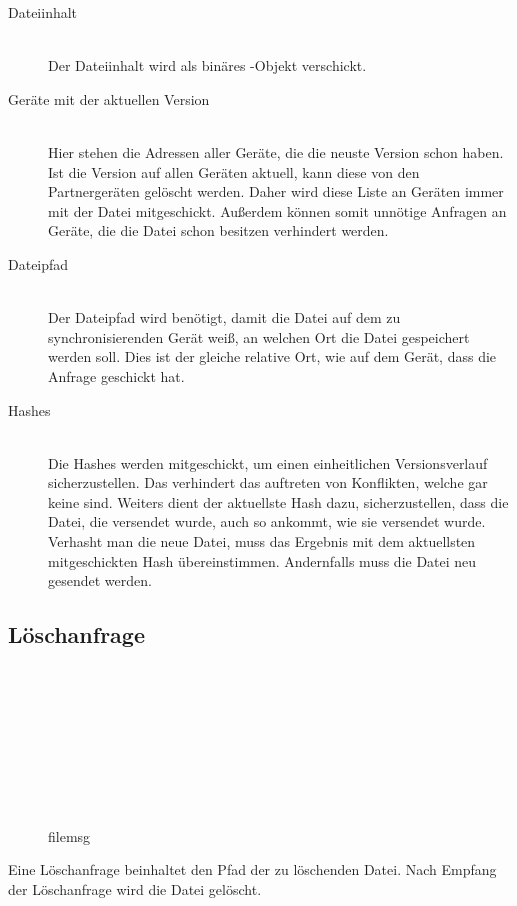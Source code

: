 \begin{description}
	\item[{Dateiinhalt}] \hfill \\
		Der Dateiinhalt wird als binäres -Objekt verschickt.
	\item[{Geräte mit der aktuellen Version}] \hfill \\
		Hier stehen die Adressen aller Geräte, die die neuste Version schon haben. Ist die Version auf allen Geräten aktuell, kann diese von den Partnergeräten gelöscht werden. Daher wird diese Liste an Geräten immer mit der Datei mitgeschickt. Außerdem können somit unnötige Anfragen an Geräte, die die Datei schon besitzen verhindert werden.
	\item[{Dateipfad}] \hfill \\
		Der Dateipfad wird benötigt, damit die Datei auf dem zu synchronisierenden Gerät weiß, an welchen Ort die Datei gespeichert werden soll. Dies ist der gleiche relative Ort, wie auf dem Gerät, dass die Anfrage geschickt hat.
	\item[{Hashes}] \hfill \\
		Die Hashes werden mitgeschickt, um einen einheitlichen Versionsverlauf sicherzustellen. Das verhindert das auftreten von Konflikten, welche gar keine sind. Weiters dient der aktuellste Hash dazu,  sicherzustellen, dass die Datei, die versendet wurde, auch so ankommt, wie sie versendet wurde. Verhasht man die neue Datei, muss das Ergebnis mit dem aktuellsten mitgeschickten Hash übereinstimmen. Andernfalls muss die Datei neu gesendet werden.
\end{description}
		
\subsection{Löschanfrage}
\begin{figure}[H]
\begin{centering}

\begin{bytefield}[bitwidth=3em]{8}
	\\
	 \\
	
	\begin{rightwordgroup}{\isprotomsgtype}
	\end{rightwordgroup} \\
	
	\begin{rightwordgroup}{\isprotomsgdata}
		 \\
		\skippedwords \\
		 \\
	\end{rightwordgroup}
	
\end{bytefield}
\par\end{centering}
\protect\caption{\gls{filemsg}}
\end{figure}		
Eine Löschanfrage beinhaltet den Pfad der zu löschenden Datei. Nach Empfang der Löschanfrage wird die Datei gelöscht.

